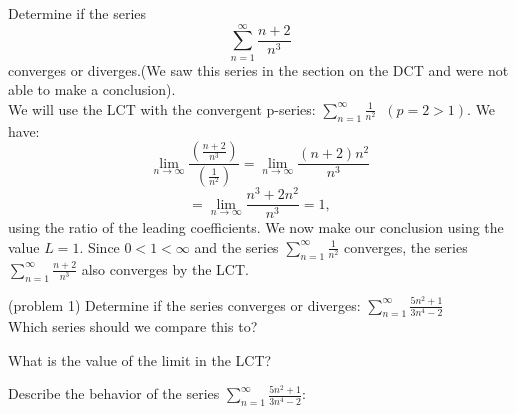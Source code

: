 \documentclass[handout]{ximera}
\begin{document}
\begin{example}[example 1]
Determine if the series 
\[
\sum_{n=1}^\infty \frac{n+2}{n^3}
\]
converges or diverges.(We saw this series in the section on the DCT and were not able to make a conclusion).\\
We will use the LCT with the convergent p-series: $\displaystyle{\sum_{n=1}^\infty \frac{1}{n^2}} \;\;(p = 2 >1)$. We have:
\[
\lim_{n \to \infty} \frac{\left(\frac{n+2}{n^3}\right)}{\left(\frac{1}{n^2}\right)} = \lim_{n \to \infty} \frac{(n+2)n^2}{n^3}
\]
\[
= \lim_{n \to \infty} \frac{n^3 +2n^2}{n^3} = 1,
\]
using the ratio of the leading coefficients. We now make our conclusion using the value $L = 1$. Since $0 < 1 < \infty$ and the series $\displaystyle{\sum_{n=1}^\infty \frac{1}{n^2}}$
converges, the series $\displaystyle{\sum_{n=1}^\infty \frac{n+2}{n^3}}$ also converges by the LCT.
\end{example}




\begin{problem}(problem 1)
Determine if the series converges or diverges: $\displaystyle{\sum_{n=1}^\infty \frac{5n^2 + 1}{3n^4 - 2}}$\\
Which series should we compare this to?

\begin{multipleChoice}
\end{multipleChoice}

What is the value of the limit in the LCT?
\begin{multipleChoice}
\end{multipleChoice}

Describe the behavior of the series $\displaystyle{\sum_{n=1}^\infty \frac{5n^2 + 1}{3n^4 - 2}:}$
\begin{multipleChoice}
\end{multipleChoice}

\end{problem}
\end{document}
